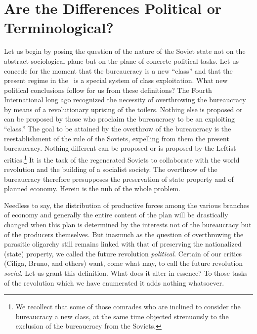 \section*{Are the Differences Political or Terminological?}

Let us begin by posing the question of the nature of the Soviet state not on the abstract sociological plane but on the plane of concrete political tasks. Let us concede for the moment that the bureaucracy is a new “class” and that the present regime in the \USSR\ is a special system of class exploitation. What new political conclusions follow for us from these definitions? The Fourth International long ago recognized the necessity of overthrowing the bureaucracy by means of a revolutionary uprising of the toilers. Nothing else is proposed or can be proposed by those who proclaim the bureaucracy to be an exploiting “class.” The goal to be attained by the overthrow of the bureaucracy is the reestablishment of the rule of the Soviets, expelling from them the present bureaucracy. Nothing different can be proposed or is proposed by the Leftist critics.\footnote{We recollect that some of those comrades who are inclined to consider the bureaucracy a new class, at the same time objected strenuously to the exclusion of the bureaucracy from the Soviets.} It is the task of the regenerated Soviets to collaborate with the world revolution and the building of a socialist society. The overthrow of the bureaucracy therefore presupposes the preservation of state property and of planned economy. Herein is the nub of the whole problem.

Needless to say, the distribution of productive forces among the various branches of economy and generally the entire content of the plan will be drastically changed when this plan is determined by the interests not of the bureaucracy but of the producers themselves. But inasmuch as the question of overthrowing the parasitic oligarchy still remains linked with that of preserving the nationalized (state) property, we called the future revolution \emph{political}. Certain of our critics (Ciliga, Bruno, and others) want, come what may, to call the future revolution \emph{social}. Let us grant this definition. What does it alter in essence? To those tasks of the revolution which we have enumerated it adds nothing whatsoever.

